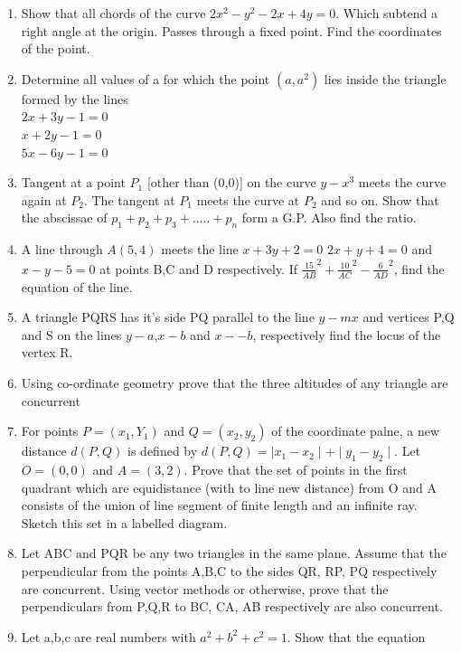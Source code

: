\documentclass[12pt]{article}
\begin{document}
\begin{enumerate}
\newpage
\item Show that all chords of the curve  $2x^2-y^2-2x+4y=0$. Which subtend a right angle at the origin. Passes through a fixed point. Find the coordinates of the point.\\
\item Determine all values of a for which the point $(a, a^2)$ lies inside the triangle formed by the lines\\
$2x+3y-1=0$\\
$x+2y-1=0$\\
$5x-6y-1=0$\\
\item Tangent at a point $P_1$ [other than (0,0)] on the curve $y-x^3$ meets the curve again at $P_2$. The tangent at $P_1$ meets the curve at $P_2$ and so on. Show that the abscissae of $p_1+p_2+p_3+.....+p_n$ form a G.P. Also find the ratio.\\
\item A line through $A(5,4)$ meets the line $x+3y+2=0$ $2x+y+4=0$ and $x-y-5=0$ at points B,C and D respectively. If    $\frac{15}{AB}^2+\frac{10}{AC}^2-\frac{6}{AD}^2$, find the equation of the line.\\
\item A triangle PQRS has it's side PQ parallel to the line $y-mx$ and vertices P,Q and S on the lines $y-a$,$ x-b$ and $x--b$, respectively find the locus of the vertex R.\\
\item Using co-ordinate geometry prove that the three altitudes of any triangle are concurrent\\
\item For points $P=(x_1,Y_1)$ and $Q=(x_2,y_2)$ of the coordinate palne, a new distance $d(P,Q)$ is defined by $d(P,Q)=\mid x_1-x_2\mid + \mid y_1-y_2\mid$. Let $O=(0,0)$  and $A=(3,2)$. Prove that the set of points in the first quadrant which are equidistance (with to line new distance) from O and A consists of the union of line segment of finite length and an infinite ray. Sketch this set in a labelled diagram.\\
\item Let ABC and PQR be any two triangles in the same plane. Assume that the perpendicular from the points A,B,C to the sides QR, RP, PQ respectively are concurrent. Using vector methods or otherwise, prove that the perpendiculars from P,Q,R to BC, CA, AB  respectively are also concurrent.\\
\item Let a,b,c are real numbers with $a^2+b^2+c^2=1$. Show that the equation\\

\end{enumerate}
\end{document}

